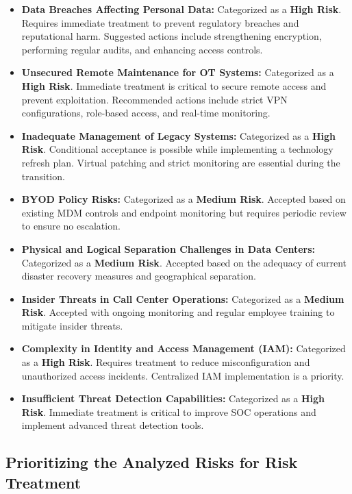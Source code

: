 \begin{itemize}
    \item \textbf{Data Breaches Affecting Personal Data:} Categorized as a \textbf{High Risk}. Requires immediate treatment to prevent regulatory breaches and reputational harm. Suggested actions include strengthening encryption, performing regular audits, and enhancing access controls.
    \item \textbf{Unsecured Remote Maintenance for OT Systems:} Categorized as a \textbf{High Risk}. Immediate treatment is critical to secure remote access and prevent exploitation. Recommended actions include strict VPN configurations, role-based access, and real-time monitoring.
    \item \textbf{Inadequate Management of Legacy Systems:} Categorized as a \textbf{High Risk}. Conditional acceptance is possible while implementing a technology refresh plan. Virtual patching and strict monitoring are essential during the transition.
    \item \textbf{BYOD Policy Risks:} Categorized as a \textbf{Medium Risk}. Accepted based on existing MDM controls and endpoint monitoring but requires periodic review to ensure no escalation.
    \item \textbf{Physical and Logical Separation Challenges in Data Centers:} Categorized as a \textbf{Medium Risk}. Accepted based on the adequacy of current disaster recovery measures and geographical separation.
    \item \textbf{Insider Threats in Call Center Operations:} Categorized as a \textbf{Medium Risk}. Accepted with ongoing monitoring and regular employee training to mitigate insider threats.
    \item \textbf{Complexity in Identity and Access Management (IAM):} Categorized as a \textbf{High Risk}. Requires treatment to reduce misconfiguration and unauthorized access incidents. Centralized IAM implementation is a priority.
    \item \textbf{Insufficient Threat Detection Capabilities:} Categorized as a \textbf{High Risk}. Immediate treatment is critical to improve SOC operations and implement advanced threat detection tools.
\end{itemize}

\subsection{Prioritizing the Analyzed Risks for Risk Treatment}

